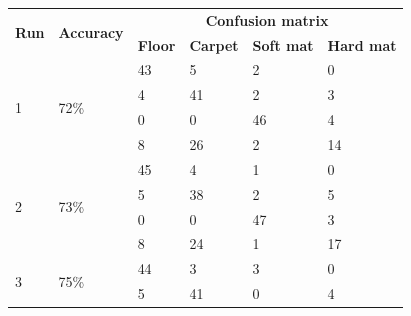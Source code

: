 \documentclass[USenglish]{ifimaster}  %
\begin{document}
	
	
	
	
	\begin{table}[h]
		\centering
		\begin{tabular}{@{}llllll@{}}
			\toprule
			\multirow{2}{*}{\textbf{Run}} & \multirow{2}{*}{\textbf{Accuracy}} & \multicolumn{4}{c}{\textbf{Confusion matrix}} \\ \cmidrule(l){3-6} 
			&  & \multicolumn{1}{l|}{\textbf{Floor}} & \multicolumn{1}{l|}{\textbf{Carpet}} & \multicolumn{1}{l|}{\textbf{Soft mat}} & \textbf{Hard mat} \\ \midrule
			\multicolumn{1}{l|}{\multirow{4}{*}{1}} & \multicolumn{1}{l|}{\multirow{4}{*}{72\%}} & \multicolumn{1}{l|}{43} & \multicolumn{1}{l|}{5} & \multicolumn{1}{l|}{2} & 0 \\ \cmidrule(l){3-6} 
			\multicolumn{1}{l|}{} & \multicolumn{1}{l|}{} & \multicolumn{1}{l|}{4} & \multicolumn{1}{l|}{41} & \multicolumn{1}{l|}{2} & 3 \\ \cmidrule(l){3-6} 
			\multicolumn{1}{l|}{} & \multicolumn{1}{l|}{} & \multicolumn{1}{l|}{0} & \multicolumn{1}{l|}{0} & \multicolumn{1}{l|}{46} & 4 \\ \cmidrule(l){3-6} 
			\multicolumn{1}{l|}{} & \multicolumn{1}{l|}{} & \multicolumn{1}{l|}{8} & \multicolumn{1}{l|}{26} & \multicolumn{1}{l|}{2} & 14 \\ \midrule
			\multicolumn{1}{l|}{\multirow{4}{*}{2}} & \multicolumn{1}{l|}{\multirow{4}{*}{73\%}} & \multicolumn{1}{l|}{45} & \multicolumn{1}{l|}{4} & \multicolumn{1}{l|}{1} & 0 \\ \cmidrule(l){3-6} 
			\multicolumn{1}{l|}{} & \multicolumn{1}{l|}{} & \multicolumn{1}{l|}{5} & \multicolumn{1}{l|}{38} & \multicolumn{1}{l|}{2} & 5 \\ \cmidrule(l){3-6} 
			\multicolumn{1}{l|}{} & \multicolumn{1}{l|}{} & \multicolumn{1}{l|}{0} & \multicolumn{1}{l|}{0} & \multicolumn{1}{l|}{47} & 3 \\ \cmidrule(l){3-6} 
			\multicolumn{1}{l|}{} & \multicolumn{1}{l|}{} & \multicolumn{1}{l|}{8} & \multicolumn{1}{l|}{24} & \multicolumn{1}{l|}{1} & 17 \\ \midrule
			\multicolumn{1}{l|}{\multirow{4}{*}{3}} & \multicolumn{1}{l|}{\multirow{4}{*}{75\%}} & \multicolumn{1}{l|}{44} & \multicolumn{1}{l|}{3} & \multicolumn{1}{l|}{3} & 0 \\ \cmidrule(l){3-6} 
			\multicolumn{1}{l|}{} & \multicolumn{1}{l|}{} & \multicolumn{1}{l|}{5} & \multicolumn{1}{l|}{41} & \multicolumn{1}{l|}{0} & 4 \\ \cmidrule(l){3-6} 

\end{tabular}
\end{table}
\end{document}
